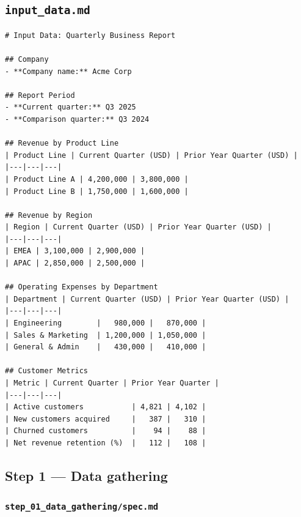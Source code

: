 \documentclass[12pt, a4paper]{article}
\begin{document}
\subsection{\texttt{input\_data.md}}

\begin{lstlisting}[language={}]
# Input Data: Quarterly Business Report

## Company
- **Company name:** Acme Corp

## Report Period
- **Current quarter:** Q3 2025
- **Comparison quarter:** Q3 2024

## Revenue by Product Line
| Product Line | Current Quarter (USD) | Prior Year Quarter (USD) |
|---|---|---|
| Product Line A | 4,200,000 | 3,800,000 |
| Product Line B | 1,750,000 | 1,600,000 |

## Revenue by Region
| Region | Current Quarter (USD) | Prior Year Quarter (USD) |
|---|---|---|
| EMEA | 3,100,000 | 2,900,000 |
| APAC | 2,850,000 | 2,500,000 |

## Operating Expenses by Department
| Department | Current Quarter (USD) | Prior Year Quarter (USD) |
|---|---|---|
| Engineering        |   980,000 |   870,000 |
| Sales & Marketing  | 1,200,000 | 1,050,000 |
| General & Admin    |   430,000 |   410,000 |

## Customer Metrics
| Metric | Current Quarter | Prior Year Quarter |
|---|---|---|
| Active customers           | 4,821 | 4,102 |
| New customers acquired     |   387 |   310 |
| Churned customers          |    94 |    88 |
| Net revenue retention (%)  |   112 |   108 |
\end{lstlisting}

\subsection{Step 1 — Data gathering}

\subsubsection{\texttt{step\_01\_data\_gathering/spec.md}}
\end{document}
